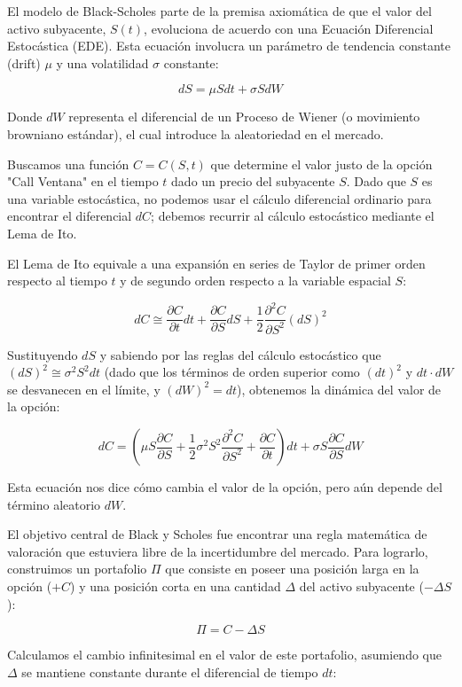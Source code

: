 \documentclass[12pt, a4paper]{article}
\begin{document}
El modelo de Black-Scholes parte de la premisa axiomática de que el valor del activo subyacente, $S(t)$, evoluciona de acuerdo con una Ecuación Diferencial Estocástica (EDE). Esta ecuación involucra un parámetro de tendencia constante (drift) $\mu$ y una volatilidad $\sigma$ constante:

\[ dS = \mu Sdt + \sigma SdW \]

Donde $dW$ representa el diferencial de un Proceso de Wiener (o movimiento browniano estándar), el cual introduce la aleatoriedad en el mercado.

Buscamos una función $C = C(S, t)$ que determine el valor justo de la opción "Call Ventana" en el tiempo $t$ dado un precio del subyacente $S$. Dado que $S$ es una variable estocástica, no podemos usar el cálculo diferencial ordinario para encontrar el diferencial $dC$; debemos recurrir al cálculo estocástico mediante el Lema de Ito.

El Lema de Ito equivale a una expansión en series de Taylor de primer orden respecto al tiempo $t$ y de segundo orden respecto a la variable espacial $S$:

\[ dC \cong \frac{\partial C}{\partial t} dt + \frac{\partial C}{\partial S} dS + \frac{1}{2} \frac{\partial^2 C}{\partial S^2} (dS)^2 \]

Sustituyendo $dS$ y sabiendo por las reglas del cálculo estocástico que $(dS)^2 \cong \sigma^2 S^2 dt$ (dado que los términos de orden superior como $(dt)^2$ y $dt \cdot dW$ se desvanecen en el límite, y $(dW)^2 = dt$), obtenemos la dinámica del valor de la opción:

\[ dC = \left( \mu S \frac{\partial C}{\partial S} + \frac{1}{2} \sigma^2 S^2 \frac{\partial^2 C}{\partial S^2} + \frac{\partial C}{\partial t} \right) dt + \sigma S \frac{\partial C}{\partial S} dW \]

Esta ecuación nos dice cómo cambia el valor de la opción, pero aún depende del término aleatorio $dW$.

El objetivo central de Black y Scholes fue encontrar una regla matemática de valoración que estuviera libre de la incertidumbre del mercado. Para lograrlo, construimos un portafolio $\Pi$ que consiste en poseer una posición larga en la opción ($+C$) y una posición corta en una cantidad $\Delta$ del activo subyacente ($-\Delta S$):

\[ \Pi = C - \Delta S \]

Calculamos el cambio infinitesimal en el valor de este portafolio, asumiendo que $\Delta$ se mantiene constante durante el diferencial de tiempo $dt$:
\end{document}
